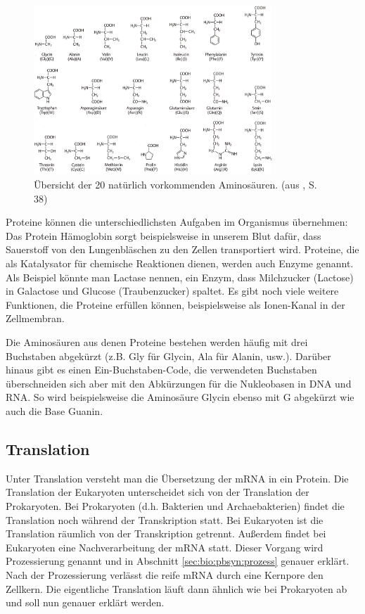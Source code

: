 \begin{figure}[htbp]
\begin{center}
\includegraphics[width=0.8\textwidth]{bilder/Aminoacids}
\end{center}
\caption{Übersicht der 20 natürlich vorkommenden Aminosäuren. (aus \citet{Knippers2006}, S. 38)}
\label{fig:bio:pbsyn:amino}
\end{figure}

Proteine können die unterschiedlichsten Aufgaben im Organismus übernehmen: Das Protein Hämoglobin sorgt beispielsweise in unserem Blut dafür, dass Sauerstoff von den Lungenbläschen zu den Zellen transportiert wird. Proteine, die als Katalysator für chemische Reaktionen dienen, werden auch Enzyme genannt. Als Beispiel könnte man Lactase nennen, ein Enzym, dass Milchzucker (Lactose) in Galactose und Glucose (Traubenzucker) spaltet. Es gibt noch viele weitere Funktionen, die Proteine erfüllen können, beispielsweise als Ionen-Kanal in der Zellmembran.

Die Aminosäuren aus denen Proteine bestehen werden häufig mit drei Buchstaben abgekürzt (z.B. Gly für Glycin, Ala für Alanin, usw.). Darüber hinaus gibt es einen Ein-Buchstaben-Code, die verwendeten Buchstaben überschneiden sich aber mit den Abkürzungen für die Nukleobasen in DNA und RNA. So wird beispielsweise die Aminosäure Glycin ebenso mit G abgekürzt wie auch die Base Guanin.




\subsection{Translation}
\label{sec:bio:pbsyn:translation}

Unter Translation versteht man die Übersetzung der mRNA in ein Protein. Die Translation der Eukaryoten unterscheidet sich von der Translation der Prokaryoten. Bei Prokaryoten (d.h. Bakterien und Archaebakterien) findet die Translation noch während der Transkription statt. Bei Eukaryoten ist die Translation räumlich von der Transkription getrennt. Außerdem findet bei Eukaryoten eine Nachverarbeitung der mRNA statt. Dieser Vorgang wird Prozessierung genannt und in Abschnitt \ref{sec:bio:pbsyn:prozess} genauer erklärt. Nach der Prozessierung verlässt die reife mRNA durch eine Kernpore den Zellkern. Die eigentliche Translation läuft dann ähnlich wie bei Prokaryoten ab und soll nun genauer erklärt werden.

